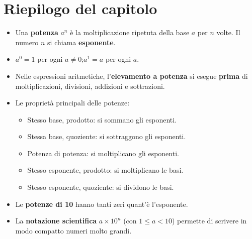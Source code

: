 \section*{Riepilogo del capitolo}

\begin{itemize}[leftmargin=1.5em]
  \item Una \textbf{potenza} $a^n$ è la moltiplicazione ripetuta della base $a$
        per $n$ volte. Il numero $n$ si chiama \textbf{esponente}.
  \item $a^0 = 1$ per ogni $a \neq 0$;\quad $a^1 = a$ per ogni $a$.
  \item Nelle espressioni aritmetiche, l'\textbf{elevamento a potenza}
        si esegue \textbf{prima} di moltiplicazioni, divisioni, addizioni
        e sottrazioni.
  \item Le proprietà principali delle potenze:
        \begin{itemize}
          \item Stesso base, prodotto: si sommano gli esponenti.
          \item Stessa base, quoziente: si sottraggono gli esponenti.
          \item Potenza di potenza: si moltiplicano gli esponenti.
          \item Stesso esponente, prodotto: si moltiplicano le basi.
          \item Stesso esponente, quoziente: si dividono le basi.
        \end{itemize}
  \item Le \textbf{potenze di 10} hanno tanti zeri quant'è l'esponente.
  \item La \textbf{notazione scientifica} $a \times 10^n$ (con $1 \leq a < 10$)
        permette di scrivere in modo compatto numeri molto grandi.
\end{itemize}

